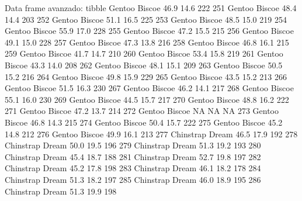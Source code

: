 \documentclass[
  ignorenonframetext,
  aspectratio=169]{beamer}
\let\oldverbatim\verbatim
\let\endoldverbatim\endverbatim
\renewenvironment{verbatim}{\tiny\oldverbatim}{\endoldverbatim}
\begin{document}
\begin{frame}[fragile]{Data frame avanzado: tibble}
\begin{verbatim}
250    Gentoo    Biscoe           46.9          14.6               222
251    Gentoo    Biscoe           48.4          14.4               203
252    Gentoo    Biscoe           51.1          16.5               225
253    Gentoo    Biscoe           48.5          15.0               219
254    Gentoo    Biscoe           55.9          17.0               228
255    Gentoo    Biscoe           47.2          15.5               215
256    Gentoo    Biscoe           49.1          15.0               228
257    Gentoo    Biscoe           47.3          13.8               216
258    Gentoo    Biscoe           46.8          16.1               215
259    Gentoo    Biscoe           41.7          14.7               210
260    Gentoo    Biscoe           53.4          15.8               219
261    Gentoo    Biscoe           43.3          14.0               208
262    Gentoo    Biscoe           48.1          15.1               209
263    Gentoo    Biscoe           50.5          15.2               216
264    Gentoo    Biscoe           49.8          15.9               229
265    Gentoo    Biscoe           43.5          15.2               213
266    Gentoo    Biscoe           51.5          16.3               230
267    Gentoo    Biscoe           46.2          14.1               217
268    Gentoo    Biscoe           55.1          16.0               230
269    Gentoo    Biscoe           44.5          15.7               217
270    Gentoo    Biscoe           48.8          16.2               222
271    Gentoo    Biscoe           47.2          13.7               214
272    Gentoo    Biscoe             NA            NA                NA
273    Gentoo    Biscoe           46.8          14.3               215
274    Gentoo    Biscoe           50.4          15.7               222
275    Gentoo    Biscoe           45.2          14.8               212
276    Gentoo    Biscoe           49.9          16.1               213
277 Chinstrap     Dream           46.5          17.9               192
278 Chinstrap     Dream           50.0          19.5               196
279 Chinstrap     Dream           51.3          19.2               193
280 Chinstrap     Dream           45.4          18.7               188
281 Chinstrap     Dream           52.7          19.8               197
282 Chinstrap     Dream           45.2          17.8               198
283 Chinstrap     Dream           46.1          18.2               178
284 Chinstrap     Dream           51.3          18.2               197
285 Chinstrap     Dream           46.0          18.9               195
286 Chinstrap     Dream           51.3          19.9               198

\end{verbatim}
\end{frame}
\end{document}
